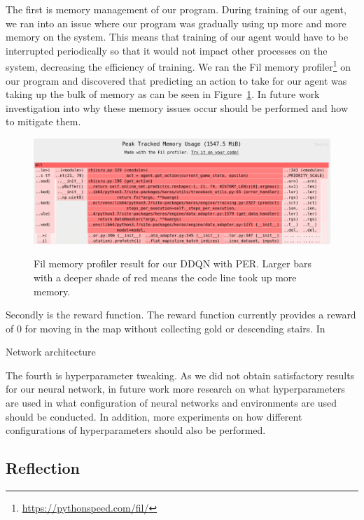 \documentclass[12pt,a4paper]{article}
\begin{document}
    The first is memory management of our program.
    During training of our agent, we ran into an issue where our program was gradually using up more and more memory on the system.
    This means that training of our agent would have to be interrupted periodically so that it would not impact other processes on the system, decreasing the efficiency of training.
    We ran the Fil memory profiler\footnote{\url{https://pythonspeed.com/fil/}} on our program and discovered that predicting an action to take for our agent was taking up the bulk of memory as can be seen in Figure~\ref{fig:fil}.
    In future work investigation into why these memory issues occur should be performed and how to mitigate them.

    \begin{figure}[h]
        \caption[Fil Profiler result for DDQN with PER.]{Fil memory profiler result for our DDQN with PER. Larger bars with a deeper shade of red means the code line took up more memory.}
        \centering
        \includegraphics[scale=0.3]{fil}
        \label{fig:fil}
    \end{figure}

    Secondly is the reward function.
    The reward function currently provides a reward of 0 for moving in the map without collecting gold or descending stairs.
    In

    Network architecture

    The fourth is hyperparameter tweaking.
    As we did not obtain satisfactory results for our neural network, in future work more research on what hyperparameters
    are used in what configuration of neural networks and environments are used should be conducted.
    In addition, more experiments on how different configurations of hyperparameters should also be performed.

    \subsection{Reflection}\label{subsec:reflection}
\end{document}
